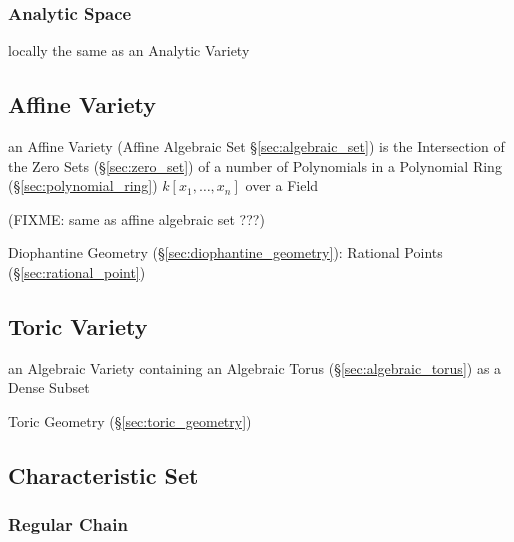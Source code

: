 \subsubsection{Analytic Space}\label{sec:analytic_space}

locally the same as an Analytic Variety




\subsection{Affine Variety}\label{sec:affine_variety}

an Affine Variety (Affine Algebraic Set \S\ref{sec:algebraic_set}) is the
Intersection of the Zero Sets (\S\ref{sec:zero_set}) of a number of Polynomials
in a Polynomial Ring (\S\ref{sec:polynomial_ring}) $k[x_1,\ldots,x_n]$ over a
Field

(FIXME: same as affine algebraic set ???)

\fist Diophantine Geometry (\S\ref{sec:diophantine_geometry}): Rational Points
(\S\ref{sec:rational_point})



\subsection{Toric Variety}\label{sec:toric_variety}

an Algebraic Variety containing an Algebraic Torus (\S\ref{sec:algebraic_torus})
as a Dense Subset

\fist Toric Geometry (\S\ref{sec:toric_geometry})



\subsection{Characteristic Set}\label{sec:characteristic_set}

\subsubsection{Regular Chain}\label{sec:regular_chain}



